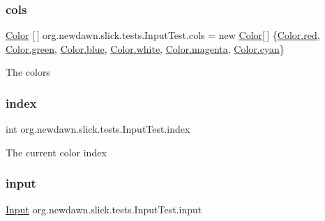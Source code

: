 \subsubsection{\texorpdfstring{cols}{cols}}
{\footnotesize\ttfamily \mbox{\hyperlink{classorg_1_1newdawn_1_1slick_1_1_color}{Color}} \mbox{[}$\,$\mbox{]} org.\+newdawn.\+slick.\+tests.\+Input\+Test.\+cols = new \mbox{\hyperlink{classorg_1_1newdawn_1_1slick_1_1_color}{Color}}\mbox{[}$\,$\mbox{]} \{\mbox{\hyperlink{classorg_1_1newdawn_1_1slick_1_1_color_aa9735c6217da1b515582e7f2273daeb6}{Color.\+red}}, \mbox{\hyperlink{classorg_1_1newdawn_1_1slick_1_1_color_a1cd4406bbd518aeb8baefcf19df24424}{Color.\+green}}, \mbox{\hyperlink{classorg_1_1newdawn_1_1slick_1_1_color_af55c4f4e0af464d15cf85939058f4567}{Color.\+blue}}, \mbox{\hyperlink{classorg_1_1newdawn_1_1slick_1_1_color_afcd91cbdd26233d226d734f70dca3d2e}{Color.\+white}}, \mbox{\hyperlink{classorg_1_1newdawn_1_1slick_1_1_color_ab806bfc25e9cab954c1056a692ef6925}{Color.\+magenta}}, \mbox{\hyperlink{classorg_1_1newdawn_1_1slick_1_1_color_ae296d247f4920ee8be313168843d4710}{Color.\+cyan}}\}\hspace{0.3cm}{\ttfamily [private]}}

The colors \mbox{\label{classorg_1_1newdawn_1_1slick_1_1tests_1_1_input_test_a9081fd3676382bf0fc4160dbe0d4738e}} 
\subsubsection{\texorpdfstring{index}{index}}
{\footnotesize\ttfamily int org.\+newdawn.\+slick.\+tests.\+Input\+Test.\+index\hspace{0.3cm}{\ttfamily [private]}}

The current color index \mbox{\label{classorg_1_1newdawn_1_1slick_1_1tests_1_1_input_test_a0f7ab1cf90c55a44d41928128e6a37a8}} 
\subsubsection{\texorpdfstring{input}{input}}
{\footnotesize\ttfamily \mbox{\hyperlink{classorg_1_1newdawn_1_1slick_1_1_input}{Input}} org.\+newdawn.\+slick.\+tests.\+Input\+Test.\+input\hspace{0.3cm}{\ttfamily [private]}}

